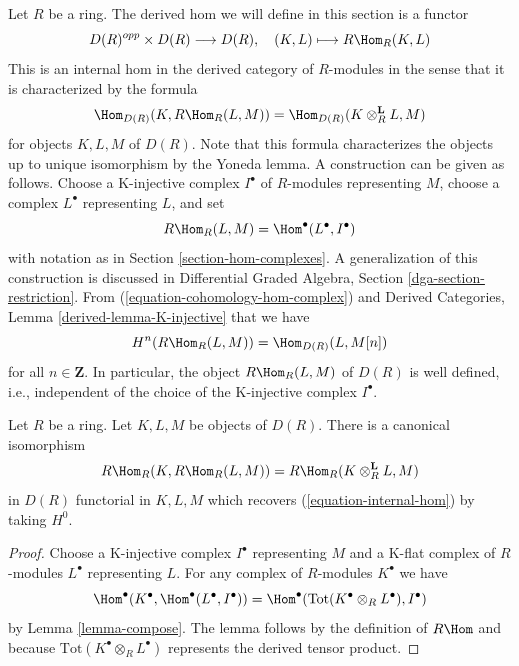 \noindent
Let $R$ be a ring. The derived hom we will define in this section is a functor
$$
D(R)^{opp} \times D(R) \longrightarrow D(R),\quad
(K, L) \longmapsto R\Hom_R(K, L)
$$
This is an internal hom in the derived category of
$R$-modules in the sense that it is characterized by the formula
\begin{equation}
\label{equation-internal-hom}
\Hom_{D(R)}(K, R\Hom_R(L, M))
=
\Hom_{D(R)}(K \otimes_R^\mathbf{L} L, M)
\end{equation}
for objects $K, L, M$ of $D(R)$. Note that this formula characterizes
the objects up to unique isomorphism by the Yoneda lemma. A construction
can be given as follows. Choose a K-injective complex $I^\bullet$
of $R$-modules representing $M$, choose a complex $L^\bullet$
representing $L$, and set
$$
R\Hom_R(L, M) = \Hom^\bullet(L^\bullet, I^\bullet)
$$
with notation as in Section \ref{section-hom-complexes}.
A generalization of this construction is discussed in
Differential Graded Algebra, Section \ref{dga-section-restriction}.
From (\ref{equation-cohomology-hom-complex}) and
Derived Categories, Lemma \ref{derived-lemma-K-injective}
that we have
\begin{equation}
\label{equation-h0-RHom}
H^n(R\Hom_R(L, M)) = \Hom_{D(R)}(L, M[n])
\end{equation}
for all $n \in \mathbf{Z}$. In particular, the object
$R\Hom_R(L, M)$ of $D(R)$ is well defined, i.e., independent of
the choice of the K-injective complex $I^\bullet$.

\begin{lemma}
\label{lemma-internal-hom}
Let $R$ be a ring. Let $K, L, M$ be objects of $D(R)$. There is a canonical
isomorphism
$$
R\Hom_R(K, R\Hom_R(L, M)) = R\Hom_R(K \otimes_R^\mathbf{L} L, M)
$$
in $D(R)$ functorial in $K, L, M$ which recovers
(\ref{equation-internal-hom}) by taking $H^0$.
\end{lemma}

\begin{proof}
Choose a K-injective complex $I^\bullet$ representing
$M$ and a K-flat complex of $R$-modules $L^\bullet$
representing $L$. For any complex of $R$-modules $K^\bullet$
we have
$$
\Hom^\bullet(K^\bullet, \Hom^\bullet(L^\bullet, I^\bullet)) =
\Hom^\bullet(\text{Tot}(K^\bullet \otimes_R L^\bullet), I^\bullet)
$$
by Lemma \ref{lemma-compose}. The lemma follows by the definition
of $R\Hom$ and because
$\text{Tot}(K^\bullet \otimes_R L^\bullet)$
represents the derived tensor product.
\end{proof}

